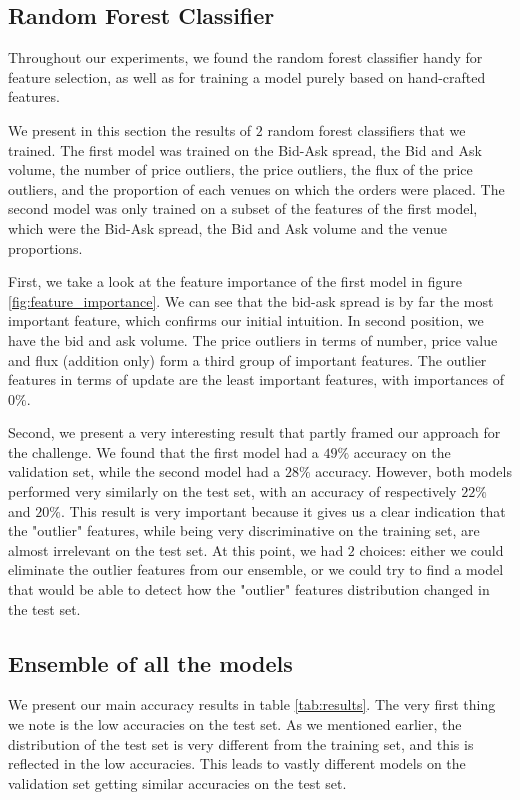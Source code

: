 \documentclass[switch, 11pt]{article}
\begin{document}
\begin{multicols}{2}
    \subsection{Random Forest Classifier}
    Throughout our experiments, we found the random forest classifier handy for feature selection, as well as for training a model purely based on hand-crafted features.

    We present in this section the results of $2$ random forest classifiers that we trained. The first model was trained on the Bid-Ask spread, the Bid and Ask volume, the number of price outliers, the price outliers, the flux of the price outliers, and the proportion of each venues on which the orders were placed. The second model was only trained on a subset of the features of the first model, which were the Bid-Ask spread, the Bid and Ask volume and the venue proportions.

    First, we take a look at the feature importance of the first model in figure \ref{fig:feature_importance}. We can see that the bid-ask spread is by far the most important feature, which confirms our initial intuition. In second position, we have the bid and ask volume. The price outliers in terms of number, price value and flux (addition only) form a third group of important features. The outlier features in terms of update are the least important features, with importances of $0 \%$.

    Second, we present a very interesting result that partly framed our approach for the challenge. We found that the first model had a $49\%$ accuracy on the validation set, while the second model had a $28\%$ accuracy. However, both models performed very similarly on the test set, with an accuracy of respectively $22\%$ and $20\%$. This result is very important because it gives us a clear indication that the "outlier" features, while being very discriminative on the training set, are almost irrelevant on the test set. At this point, we had $2$ choices: either we could eliminate the outlier features from our ensemble, or we could try to find a model that would be able to detect how the "outlier" features distribution changed in the test set.

    \subsection{Ensemble of all the models}

    We present our main accuracy results in table \ref{tab:results}. The very first thing we note is the low accuracies on the test set. As we mentioned earlier, the distribution of the test set is very different from the training set, and this is reflected in the low accuracies. This leads to vastly different models on the validation set getting similar accuracies on the test set.


\end{multicols}
\end{document}
